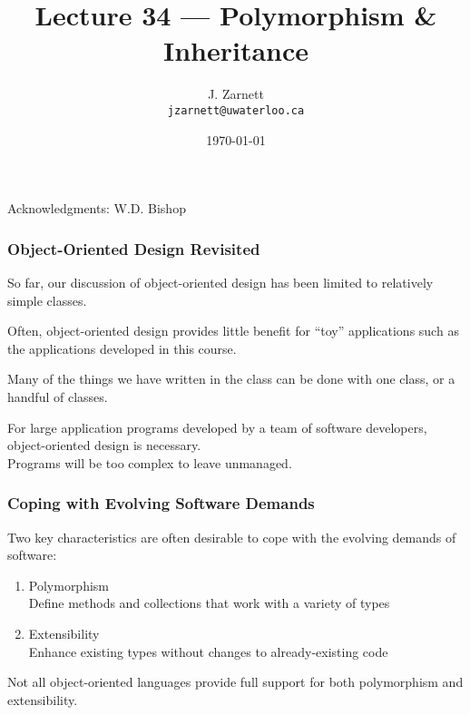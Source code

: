 

\title{Lecture 34 --- Polymorphism \& Inheritance }

\author{J. Zarnett\\
\texttt{jzarnett@uwaterloo.ca}}
\date{\today}



\begin{frame}
  \titlepage
  
  \begin{center}
  \small{Acknowledgments: W.D. Bishop}
  \end{center}
\end{frame}


\begin{frame}
\frametitle{Object-Oriented Design Revisited}

So far, our discussion of object-oriented design has been limited to relatively simple classes.

Often, object-oriented design provides little benefit for ``toy'' applications such as the applications developed in this course.

Many of the things we have written in the class can be done with one class, or a handful of classes.

For large application programs developed by a team of software developers, object-oriented design is necessary.\\
\quad Programs will be too complex to leave unmanaged.

\end{frame}

\begin{frame}
\frametitle{Coping with Evolving Software Demands}

Two key characteristics are often desirable to cope with the evolving demands of software:
\begin{enumerate}
\item \alert{Polymorphism} \\
    Define methods and collections that work with a variety of types
\item \alert{Extensibility}\\
    Enhance existing types without changes to already-existing code
\end{enumerate}

Not all object-oriented languages provide full support for both polymorphism and extensibility.

\end{frame}

